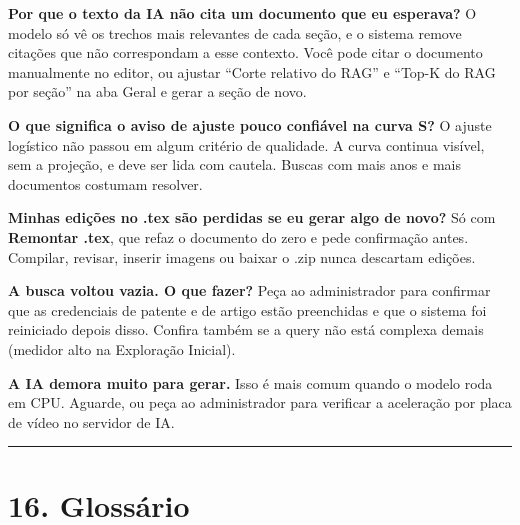 \documentclass[
  brazilian,
  a4paper,12pt,oneside]{report}
\begin{document}
\textbf{Por que o texto da IA não cita um documento que eu esperava?} O
modelo só vê os trechos mais relevantes de cada seção, e o sistema
remove citações que não correspondam a esse contexto. Você pode citar o
documento manualmente no editor, ou ajustar ``Corte relativo do RAG'' e
``Top-K do RAG por seção'' na aba Geral e gerar a seção de novo.

\textbf{O que significa o aviso de ajuste pouco confiável na curva S?} O
ajuste logístico não passou em algum critério de qualidade. A curva
continua visível, sem a projeção, e deve ser lida com cautela. Buscas
com mais anos e mais documentos costumam resolver.

\textbf{Minhas edições no .tex são perdidas se eu gerar algo de novo?}
Só com \textbf{Remontar .tex}, que refaz o documento do zero e pede
confirmação antes. Compilar, revisar, inserir imagens ou baixar o .zip
nunca descartam edições.

\textbf{A busca voltou vazia. O que fazer?} Peça ao administrador para
confirmar que as credenciais de patente e de artigo estão preenchidas e
que o sistema foi reiniciado depois disso. Confira também se a query não
está complexa demais (medidor alto na Exploração Inicial).

\textbf{A IA demora muito para gerar.} Isso é mais comum quando o modelo
roda em CPU. Aguarde, ou peça ao administrador para verificar a
aceleração por placa de vídeo no servidor de IA.

\begin{center}\rule{0.5\linewidth}{0.5pt}\end{center}

\chapter{16. Glossário}\label{glossuxe1rio}
\end{document}
